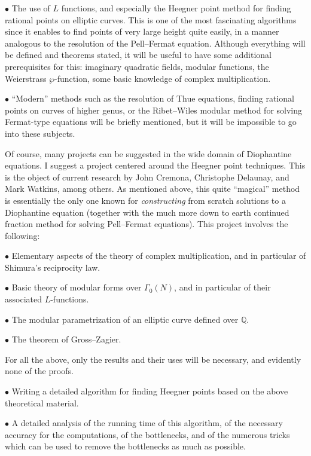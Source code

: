 \documentclass[12pt]{article}
\newcommand{\Q}{{\mathbb Q}}
\begin{document}
\smallskip

$\bullet$ The use of $L$ functions, and especially the Heegner point method
for finding rational points on elliptic curves. This is one of the most
fascinating algorithms since it enables to find points of very large height
quite easily, in a manner analogous to the resolution of the Pell--Fermat
equation. Although everything will be defined and theorems stated, it will be
useful to have some additional prerequisites for this: imaginary quadratic 
fields, modular functions, the Weierstrass $\wp$-function, some basic knowledge
of complex multiplication.

\smallskip

$\bullet$ ``Modern'' methods such as the resolution of Thue equations, finding
rational points on curves of higher genus, or the Ribet--Wiles modular method
for solving Fermat-type equations will be briefly mentioned, but it will be
impossible to go into these subjects.

\bigskip

Of course, many projects can be suggested in the wide domain of Diophantine
equations. I suggest a project centered around the Heegner point
techniques. This is the object of current research by John Cremona, 
Christophe Delaunay, and Mark Watkins, among others. As mentioned above, this
quite ``magical'' method is essentially the only one known for
\emph{constructing} from scratch solutions to a Diophantine equation
(together with the much more down to earth continued fraction method
for solving Pell--Fermat equations). This project involves the following:

\smallskip

$\bullet$ Elementary aspects of the theory of complex multiplication, and in 
particular of Shimura's reciprocity law.

$\bullet$ Basic theory of modular forms over $\Gamma_0(N)$, and in particular 
of their associated $L$-functions.

$\bullet$ The modular parametrization of an elliptic curve defined over $\Q$.

$\bullet$ The theorem of Gross--Zagier.

For all the above, only the results and their uses will be necessary,
and evidently none of the proofs.

$\bullet$ Writing a detailed algorithm for finding Heegner points based on
the above theoretical material.

$\bullet$ A detailed analysis of the running time of this algorithm, of the
necessary accuracy for the computations, of the bottlenecks, and of the 
numerous tricks which can be used to remove the bottlenecks as much as 
possible.
\end{document}
